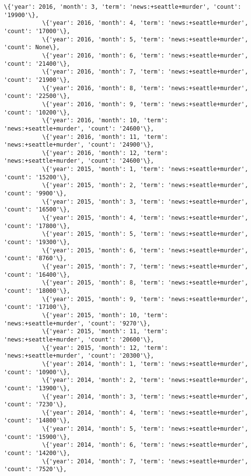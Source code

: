 \documentclass[11pt]{article}
\begin{document}
\begin{Verbatim}[commandchars=\\\{\}]
           \{'year': 2016, 'month': 3, 'term': 'news:+seattle+murder', 'count': '19900'\},
           \{'year': 2016, 'month': 4, 'term': 'news:+seattle+murder', 'count': '17000'\},
           \{'year': 2016, 'month': 5, 'term': 'news:+seattle+murder', 'count': None\},
           \{'year': 2016, 'month': 6, 'term': 'news:+seattle+murder', 'count': '21400'\},
           \{'year': 2016, 'month': 7, 'term': 'news:+seattle+murder', 'count': '21900'\},
           \{'year': 2016, 'month': 8, 'term': 'news:+seattle+murder', 'count': '22500'\},
           \{'year': 2016, 'month': 9, 'term': 'news:+seattle+murder', 'count': '10200'\},
           \{'year': 2016, 'month': 10, 'term': 'news:+seattle+murder', 'count': '24600'\},
           \{'year': 2016, 'month': 11, 'term': 'news:+seattle+murder', 'count': '24900'\},
           \{'year': 2016, 'month': 12, 'term': 'news:+seattle+murder', 'count': '24600'\},
           \{'year': 2015, 'month': 1, 'term': 'news:+seattle+murder', 'count': '15200'\},
           \{'year': 2015, 'month': 2, 'term': 'news:+seattle+murder', 'count': '9900'\},
           \{'year': 2015, 'month': 3, 'term': 'news:+seattle+murder', 'count': '16500'\},
           \{'year': 2015, 'month': 4, 'term': 'news:+seattle+murder', 'count': '17800'\},
           \{'year': 2015, 'month': 5, 'term': 'news:+seattle+murder', 'count': '19300'\},
           \{'year': 2015, 'month': 6, 'term': 'news:+seattle+murder', 'count': '8760'\},
           \{'year': 2015, 'month': 7, 'term': 'news:+seattle+murder', 'count': '16400'\},
           \{'year': 2015, 'month': 8, 'term': 'news:+seattle+murder', 'count': '18000'\},
           \{'year': 2015, 'month': 9, 'term': 'news:+seattle+murder', 'count': '17100'\},
           \{'year': 2015, 'month': 10, 'term': 'news:+seattle+murder', 'count': '9270'\},
           \{'year': 2015, 'month': 11, 'term': 'news:+seattle+murder', 'count': '20600'\},
           \{'year': 2015, 'month': 12, 'term': 'news:+seattle+murder', 'count': '20300'\},
           \{'year': 2014, 'month': 1, 'term': 'news:+seattle+murder', 'count': '10900'\},
           \{'year': 2014, 'month': 2, 'term': 'news:+seattle+murder', 'count': '13900'\},
           \{'year': 2014, 'month': 3, 'term': 'news:+seattle+murder', 'count': '7230'\},
           \{'year': 2014, 'month': 4, 'term': 'news:+seattle+murder', 'count': '14800'\},
           \{'year': 2014, 'month': 5, 'term': 'news:+seattle+murder', 'count': '15900'\},
           \{'year': 2014, 'month': 6, 'term': 'news:+seattle+murder', 'count': '14200'\},
           \{'year': 2014, 'month': 7, 'term': 'news:+seattle+murder', 'count': '7520'\},

\end{Verbatim}
\end{document}
